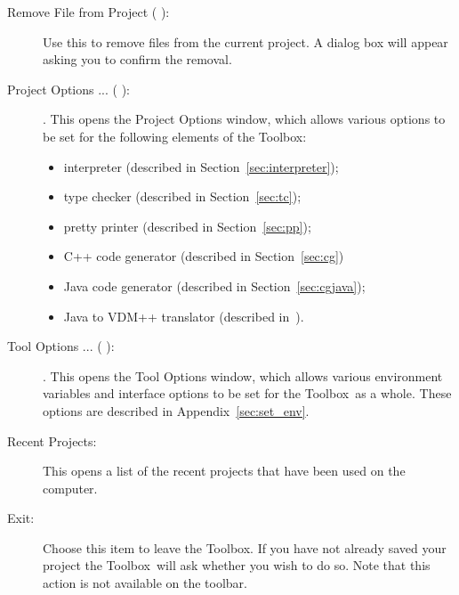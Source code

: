 \documentclass[\pformat,12pt]{article}
\newcommand{\Toolbox}{Toolbox}
\newcommand{\guicmd}[1]{{\sf #1}}
\begin{document}
\begin{description}
\item[\guicmd{Remove File from Project} (\hspace{-1.5mm}
 ):]
 Use this to remove files from
 the current project. A dialog box will appear asking you to confirm
 the removal. 

\item[\guicmd{Project Options ...} (\hspace{-1.5mm}
):].
  This opens the \guicmd{Project Options} window, which allows various options
  to be set for the following elements of the \Toolbox:
  \begin{itemize}
    \item \guicmd{interpreter} (described in
  Section~\ref{sec:interpreter});
    \item \guicmd{type checker}  (described in Section~\ref{sec:tc});
    \item \guicmd{pretty printer}  (described in Section~\ref{sec:pp});
    \item \guicmd{C++ code generator} (described in Section~\ref{sec:cg})%

    \item \guicmd{Java code generator}  (described in Section~\ref{sec:cgjava});
    \item \guicmd{Java to VDM++ translator}  (described in~\cite{Java2VDMMan-SCSK}). 
  \end{itemize}

\item[\guicmd{Tool Options ...} (\hspace{-1.5mm}
):].
  This opens the \guicmd{Tool Options} window, which allows various
  environment variables and interface options to be set for the
  \Toolbox\ as a whole. These options are described in
  Appendix~\ref{sec:set_env}. 

\item[\guicmd{Recent Projects}:]
  This opens a list of the recent projects that have been used on the
  computer.

\item[\guicmd{Exit}:] Choose this item to leave the \Toolbox. If you
  have not already saved your project the \Toolbox\ will ask whether
  you wish to do so. Note that this action is not available on the
  toolbar. 


\end{description}
\end{document}
